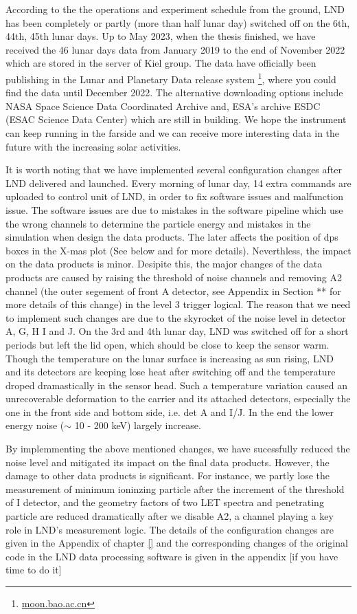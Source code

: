 According to the the operations and experiment schedule from the ground, \ac{LND} has been completely or partly (more than half lunar day) switched off on the 6th, 44th, 45th lunar days. Up to May 2023, when the thesis finished, we have received the 46 lunar days data from January 2019 to the end of November 2022 which are stored in the server of Kiel group. The data have officially been publishing in the Lunar and Planetary Data release system \footnote{\url{moon.bao.ac.cn}}, where you could find the data until December 2022. 
The alternative downloading options include NASA Space Science Data Coordinated Archive and, ESA's archive ESDC (ESAC Science Data Center) which are still in building. We hope the instrument can keep running in the farside and we can receive more interesting data in the future with the increasing solar activities.


It is worth noting that we have implemented several configuration changes after \ac{LND} delivered and launched. Every morning of lunar day, 14 extra commands are uploaded to control unit of LND, in order to fix software issues and malfunction issue. The software issues are due to mistakes in the software pipeline which use the wrong channels to determine the particle energy and mistakes in the simulation when design the data products. The later affects the position of \ac{dps} boxes in the X-mas plot (See below and \citet{Wimmer-2020-LND} for more details). Neverthless, the impact on the data products is minor. 
Desipite this, the major changes of the data products are caused by raising the threshold of noise channels and removing A2 channel (the outer segement of front A detector, see Appendix in Section ** for more details of this change) in the level 3 trigger logical. The reason that we need to implement such changes are due to the skyrocket of the noise level in detector A, G, H I and J. On the 3rd and 4th lunar day, \ac{LND} was switched off for a short periods but left the lid open, which should be close to keep the sensor warm. Though the temperature on the lunar surface is increasing as sun rising, \ac{LND} and its detectors are keeping lose heat after switching off and the temperature droped dramastically in the sensor head. Such a temperature variation caused an unrecoverable deformation to the carrier and its attached detectors, especially the one in the front side and bottom side, i.e. det A and I/J. In the end the lower energy noise ($\sim$ 10 - 200 keV) largely increase.

By implemmenting the above mentioned changes, we have sucessfully reduced the noise level and mitigated its impact on the final data products. However, the damage to other data products is significant. For instance, we partly lose the measurement of minimum ioninzing particle after the increment of the threshold of I detector, and the geometry factors of two \ac{LET} spectra and penetrating particle are reduced dramatically after we disable A2, a channel playing a key role in \ac{LND}'s measurement logic. The details of the configuration changes are given in the Appendix of chapter \ref{} and the corresponding changes of the original code in the LND data processing software is given in the appendix [if you have time to do it]



